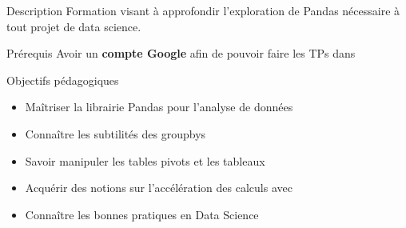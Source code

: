 \begin{frame}{Description}
  Formation visant à approfondir l'exploration de Pandas nécessaire à tout projet de data science.
\end{frame}

\begin{frame}{Prérequis}
  Avoir un \textbf{compte Google} afin de pouvoir faire les TPs dans 
\end{frame}

\begin{frame}{Objectifs pédagogiques}

\begin{itemize}
  \item Maîtriser la librairie Pandas pour l’analyse de données
  \item Connaître les subtilités des groupbys
  \item Savoir manipuler les tables pivots et les tableaux 
  \item Acquérir des notions sur l’accélération des calculs avec 
  \item Connaître les bonnes pratiques en Data Science
\end{itemize}

\end{frame}
